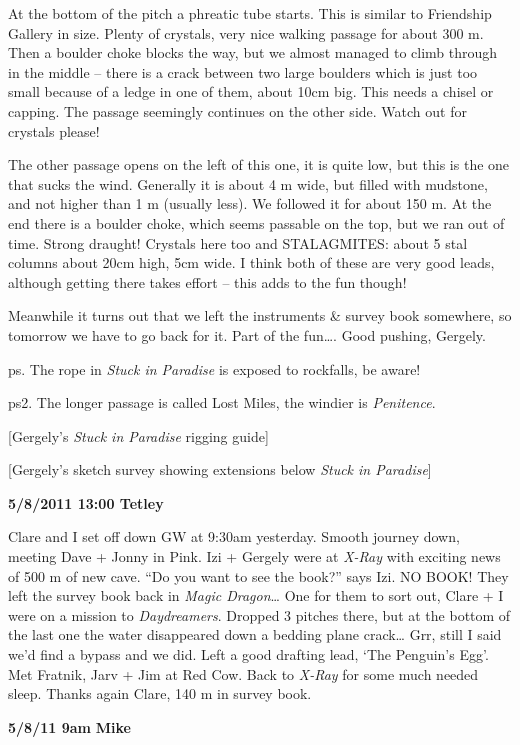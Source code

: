 At the bottom of the pitch a phreatic tube starts. This is similar to
Friendship Gallery in size. Plenty of crystals, very nice walking
passage for about 300 m. Then a boulder choke blocks the way, but we
almost managed to climb through in the middle -- there is a crack
between two large boulders which is just too small because of a ledge in
one of them, about 10cm big. This needs a chisel or capping. The passage
seemingly continues on the other side. Watch out for crystals please!

The other passage opens on the left of this one, it is quite low, but
this is the one that sucks the wind. Generally it is about 4 m wide, but
filled with mudstone, and not higher than 1 m (usually less). We
followed it for about 150 m. At the end there is a boulder choke, which
seems passable on the top, but we ran out of time. Strong draught!
Crystals here too and STALAGMITES: about 5 stal columns about 20cm high,
5cm wide. I think both of these are very good leads, although getting
there takes effort -- this adds to the fun though!

Meanwhile it turns out that we left the instruments \& survey book
somewhere, so tomorrow we have to go back for it. Part of the
fun\ldots{}. Good pushing, Gergely.

ps. The rope in \emph{Stuck in Paradise} is exposed to rockfalls, be
aware!

ps2. The longer passage is called Lost Miles, the windier is
\emph{Penitence}.

{[}Gergely's \emph{Stuck in Paradise} rigging guide{]}

{[}Gergely's sketch survey showing extensions below \emph{Stuck in
Paradise}{]}

\textbf{5/8/2011 13:00 Tetley}

Clare and I set off down GW at 9:30am yesterday. Smooth journey down,
meeting Dave + Jonny in Pink. Izi + Gergely were at \emph{X-Ray} with
exciting news of 500 m of new cave. ``Do you want to see the book?''
says Izi. NO BOOK! They left the survey book back in \emph{Magic
Dragon}\ldots{} One for them to sort out, Clare + I were on a mission to
\emph{Daydreamers}. Dropped 3 pitches there, but at the bottom of the
last one the water disappeared down a bedding plane crack\ldots{} Grr,
still I said we'd find a bypass and we did. Left a good drafting lead,
`The Penguin's Egg'. Met Fratnik, Jarv + Jim at Red Cow. Back to
\emph{X-Ray} for some much needed sleep. Thanks again Clare, 140 m in
survey book.

\textbf{5/8/11 9am} \textbf{Mike}

